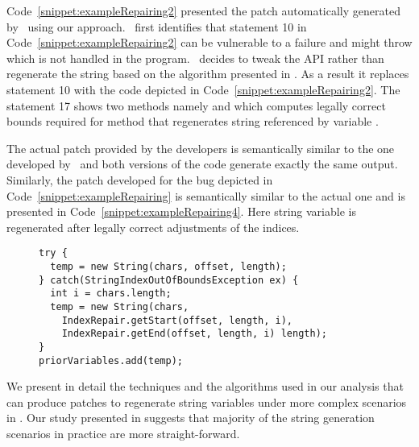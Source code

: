 Code~\ref{snippet:exampleRepairing2} presented the patch automatically
generated by \tool\
using our approach. \tool\ first identifies that statement 10 in
Code~\ref{snippet:exampleRepairing2}
can be vulnerable to a failure and might throw 
which is not handled in the program.
\tool\ decides to tweak the API rather than regenerate the string based
on the algorithm presented in
. As a result it replaces statement 10 with the
code depicted in Code~\ref{snippet:exampleRepairing2}. The statement 17 shows
two methods namely \code{getStart} and \code{getEnd}
which computes legally correct bounds required for  method that
regenerates string referenced by variable \code{temp}. 

The actual patch provided by the developers is semantically similar to the one
developed by \tool\ and both versions
of the code generate exactly the same output. Similarly, the patch developed for
the bug depicted in Code~\ref{snippet:exampleRepairing}
is semantically similar to the actual one and is presented in
Code~\ref{snippet:exampleRepairing4}. Here string
variable  is regenerated after legally correct adjustments of the
indices.

\lstset{language=java, caption=Patch for the Appache Log4j bug,
label = snippet:exampleRepairing4, firstnumber =4}
\begin{figure}[t]
\centering
\begin{lstlisting}
try {
  temp = new String(chars, offset, length);
} catch(StringIndexOutOfBoundsException ex) {
  int i = chars.length;
  temp = new String(chars,
    IndexRepair.getStart(offset, length, i),
    IndexRepair.getEnd(offset, length, i) length);
}
priorVariables.add(temp);
\end{lstlisting}
\end{figure}

We present in detail the techniques and the algorithms used in our analysis that
can produce patches to regenerate string variables under more
complex scenarios in  . Our study presented in
\xref{sec:evaluation} suggests that majority
of the string generation scenarios in practice are more straight-forward.





















